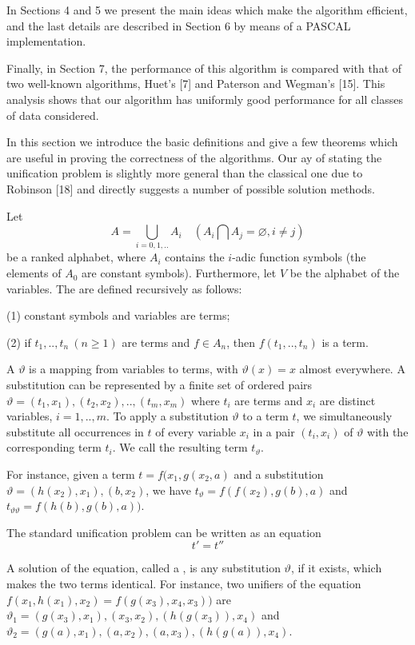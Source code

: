 In Sections 4 and 5 we present the main ideas which make the algorithm
efficient, and the last details are described in Section 6 by means of a PASCAL
implementation.

Finally, in Section 7, the performance of this algorithm is compared with that
of two well-known algorithms, Huet's [7] and Paterson and Wegman's [15]. This
analysis shows that our algorithm has uniformly good performance for all classes
of data considered.


In this section we introduce the basic definitions and give a few theorems which
are useful in proving the correctness of the algorithms. Our ay of stating the
unification problem is slightly more general than the classical one due to
Robinson [18] and directly suggests a number of possible solution methods.

Let
\[A= \bigcup_{i=0,1,..} A_i \quad (A_i \bigcap A_j = \varnothing, i \neq j)\] be
a ranked alphabet, where $A_i$ contains the $i$-adic function symbols
(the elements of $A_0$ are constant symbols). Furthermore, let $V$ be the
alphabet of the variables.
The  are defined recursively as follows:

(1) constant symbols and variables are terms;

(2) if $t_1,..,t_n \ (n \geq 1)$ are terms and $f \in A_n$,
then $f(t_1,..,t_n)$ is a term.

A  $\vartheta$ is a mapping from variables to terms,
with $\vartheta(x)=x$ almost everywhere. A substitution can be represented
by a finite set of ordered pairs
$\vartheta={(t_1,x_1),(t_2,x_2),..,(t_m,x_m)}$
where $t_i$ are terms and $x_i$ are distinct variables,
$i = 1,..,m$. To apply a substitution $\vartheta$ to a term $t$, we
simultaneously substitute all occurrences in $t$ of every variable $x_i$ in a
pair $(t_i, x_i)$ of $\vartheta$ with the corresponding term $t_i$. We call the
resulting term $t_\vartheta$.

For instance, given a term $t = f(x_1, g(x_2, a)$ and a substitution 
$\vartheta = {(h(x_2),x_1),(b,x_2)}$, 
we have $t_\vartheta = f(f(x_2),g(b),a)$ and $t_{\vartheta\vartheta} =
f(h(b),g(b),a))$.

The standard unification problem can be written as an equation \[t'=t''\]

A solution of the equation, called a , is any substitution
$\vartheta$, if it exists, which makes the two terms identical. For instance,
two unifiers of the equation $f(x_1,h(x_1),x_2)=f(g(x_3),x_4,x_3))$ are
$\vartheta_1={(g(x_3),x_1),(x_3,x_2),(h(g(x_3)),x_4)}$ and
$\vartheta_2={(g(a),x_1),(a,x_2),(a,x_3),(h(g(a)),x_4)}$.

